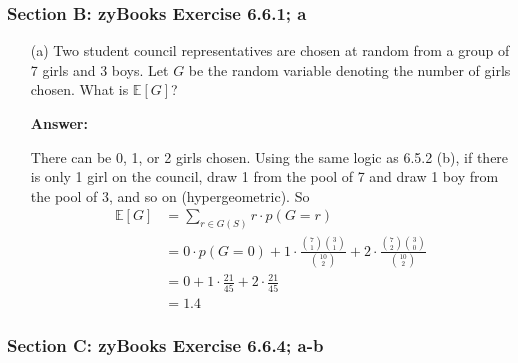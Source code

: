 \documentclass[14pt]{extreport}
\newcommand{\answer}[0]{\medskip \textbf{Answer:} \medskip}
\begin{document}
\subsubsection*{Section B: zyBooks Exercise 6.6.1; a}

\begin{enumerate}

    \item[(a)] Two student council representatives are chosen at random from a group of 7 girls and 3 boys. Let \( G \) be the random variable denoting the number of girls chosen. What is \( \mathbb{E}[G] \)?
    
        \answer

        There can be 0, 1, or 2 girls chosen. Using the same logic as 6.5.2 (b), if there is only 1 girl on the council, draw 1 from the pool of 7 and draw 1 boy from the pool of 3, and so on (hypergeometric). So
        \begin{align*}
            \mathbb{E}[G] &= \sum_{r \in G(S)} r \cdot p(G = r) \\
                 &= 0 \cdot p(G = 0) + 1 \cdot \frac{\binom{7}{1} \binom{3}{1}}{\binom{10}{2}} + 2 \cdot \frac{\binom{7}{2} \binom{3}{0}}{\binom{10}{2}} \\
                 &= 0 + 1 \cdot \frac{21}{45} + 2 \cdot \frac{21}{45} \\
                 &= 1.4
        \end{align*}

\end{enumerate}

\subsubsection*{Section C: zyBooks Exercise 6.6.4; a-b}
\end{document}
